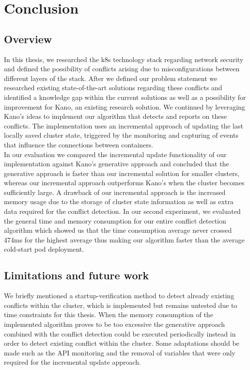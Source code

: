 \chapter{Conclusion}                     \label{ch:conclusion}
\section{Overview} \label{sec:overview}
In this thesis, we researched the \acrshort{k8s} technology stack regarding network security and defined the possibility of conflicts arising due to misconfigurations between different layers of the stack. After we defined our problem statement we researched existing state-of-the-art solutions regarding these conflicts and identified a knowledge gap within the current solutions as well as a possibility for improvement for Kano, an existing research solution. We continued by leveraging Kano's ideas to implement our algorithm that detects and reports on these conflicts. The implementation uses an incremental approach of updating the last locally saved cluster state, triggered by the monitoring and capturing of events that influence the connections between containers. 
\\[10pt]

In our evaluation we compared the incremental update functionality of our implementation against Kano's generative approach and concluded that the generative approach is faster than our incremental solution for smaller clusters, whereas our incremental approach outperforms Kano's when the cluster becomes sufficiently large. A drawback of our incremental approach is the increased memory usage due to the storage of cluster state information as well as extra data required for the conflict detection. In our second experiment, we evaluated the general time and memory consumption for our entire conflict detection algorithm which showed us that the time consumption average never crossed 474ms for the highest average thus making our algorithm faster than the average cold-start pod deployment.
\\[10pt]



\section{Limitations and future work} \label{sec:futurework}
We briefly mentioned a startup-verification method to detect already existing conflicts within the cluster, which is implemented but remains untested due to time constraints for this thesis. When the memory consumption of the implemented algorithm proves to be too excessive the generative approach combined with the conflict detection could be executed periodically instead in order to detect existing conflict within the cluster. Some adaptations should be made such as the API monitoring and the removal of variables that were only required for the incremental update approach.
\\[10pt]

